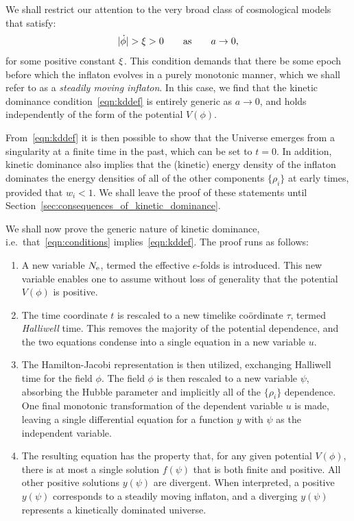 We shall restrict our attention to the very broad class of cosmological models that satisfy:
%
\begin{equation}
|\dot{\phi}| > \xi > 0 \qquad \text{as} \qquad a\to 0, 
\label{eqn:conditions}
\end{equation}
%
for some positive constant $\xi$.  This condition demands that there be some epoch before which the inflaton evolves in a purely monotonic manner, which we shall refer to as a {\em steadily moving inflaton}. In this case, we find that the kinetic dominance condition~\eqref{eqn:kddef} is entirely generic as $a \to 0$, and holds independently of the form of the potential $V(\phi)$.

From~\eqref{eqn:kddef} it is then possible to show that the Universe emerges from a singularity at a finite time in the past, which can be set to $t=0$. In addition, kinetic dominance also implies that the (kinetic) energy density of the inflaton dominates the energy densities of all of the other components $\{\rho_i\}$ at early times, provided that $w_i<1$. We shall leave the proof of these statements until Section~\ref{sec:consequences_of_kinetic_dominance}. 

We shall now prove the generic nature of kinetic dominance, i.e.\ that~\eqref{eqn:conditions} implies~\eqref{eqn:kddef}. The proof runs as follows:
%
\renewcommand{\theenumi}{\Alph{enumi}}
%
\begin{enumerate}
  \item                                        
    A new variable $N_\mathrm{e}$, termed the effective $e$-folds is introduced. This new variable enables one to assume without loss of generality that the potential $V(\phi)$ is positive.
  \item
    The time coordinate $t$ is rescaled to a new timelike co\"{o}rdinate $\tau$, termed {\em Halliwell\/} time. This removes the majority of the potential dependence, and the two equations condense into a single equation in a new variable $u$.
  \item
    The Hamilton-Jacobi representation is then utilized, exchanging Halliwell time for the field $\phi$. The field $\phi$ is then rescaled to a new variable $\psi$, absorbing the Hubble parameter and implicitly all of the $\{\rho_i\}$ dependence. One final monotonic transformation of the dependent variable $u$ is made, leaving a single differential equation for a function $y$ with $\psi$ as the independent variable.
  \item
    The resulting equation has the property that, for any given potential $V(\phi)$, there is at most a single solution $f(\psi)$ that is both finite and positive. All other positive solutions $y(\psi)$ are divergent.  When interpreted, a positive $y(\psi)$ corresponds to a steadily moving inflaton, and a diverging $y(\psi)$ represents a kinetically dominated universe.
\end{enumerate}
%


